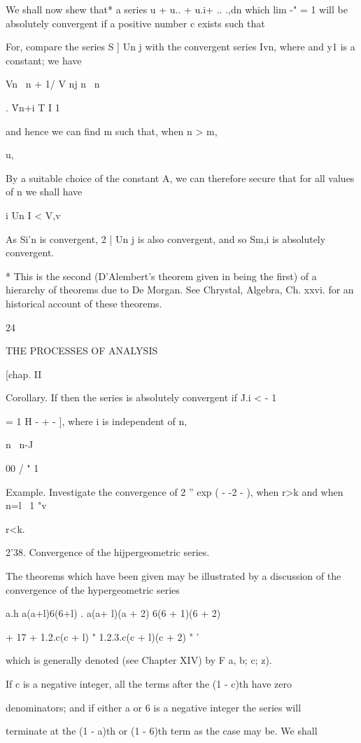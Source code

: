We shall now shew that* a series u + u.. + u.i+ .. .,dn which lim -" =
1 will be absolutely convergent if a positive number c exists such
that

For, compare the series S ] Un j with the convergent series Ivn, where
and y1 is a constant; we have

Vn \ n + 1/ V nj n \ n

. \'Vn+i T I 1

and hence we can find m such that, when n > m,

u,

By a suitable choice of the constant A, we can therefore secure that
for all values of n we shall have

i Un I < V,v

As Si'n is convergent, 2 | Un j is also convergent, and so Sm,i is
absolutely convergent.

* This is the second (D'Alembert's theorem given in being the
first) of a hierarchy of theorems due to De Morgan. See Chrystal,
Algebra, Ch. xxvi. for an historical account of these theorems.

24

THE PROCESSES OF ANALYSIS

[chap. II

Corollary. If then the series is absolutely convergent if J.i < - 1

= 1 H - + - ], where i is independent of n,

n \ n-J

00 / " 1 \

Example. Investigate the convergence of 2 '' exp ( - -2 - ), when r>k
and when n=l \ 1 "v

r<k.

2'38. Convergence of the hijpergeometric series.

The theorems which have been given may be illustrated by a discussion
of the convergence of the hypergeometric series

  a.h a(a+l)6(6+l) . a(a+ l)(a + 2) 6(6 + 1)(6 + 2)

  + 17 + 1.2.c(c + l) " 1.2.3.c(c + l)(c + 2) " '

which is generally denoted (see Chapter XIV) by F a, b; c; z).

If c is a negative integer, all the terms after the (1 - c)th have
zero

denominators; and if either a or 6 is a negative integer the series
will

terminate at the (1 - a)th or (1 - 6)th term as the case may be. We
shall

